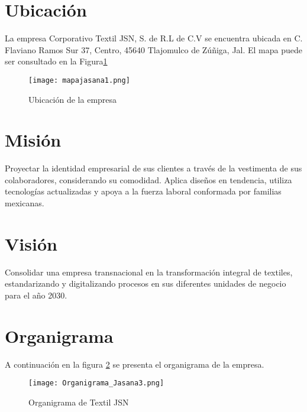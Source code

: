 \documentclass[12pt,letterpaper,spanish]{report}
\begin{document}

\section{Ubicación}
La empresa Corporativo Textil JSN, S. de R.L de C.V se encuentra ubicada en C. Flaviano Ramos Sur 37, Centro, 45640 Tlajomulco de Zúñiga, Jal. El mapa puede ser consultado en la Figura\ref{a1}

\begin{figure}[htp]
  \centering
  \texttt{[image: mapajasana1.png]}
  \caption{Ubicación de la empresa}\label{a1}
\end{figure}




\section{Misión}
Proyectar la identidad empresarial de sus clientes a través de la vestimenta de sus colaboradores, considerando su comodidad. Aplica diseños en tendencia, utiliza tecnologías actualizadas y apoya a la fuerza laboral conformada por familias mexicanas.

\section{Visión}
Consolidar una empresa transnacional en la transformación integral de textiles, estandarizando y digitalizando procesos en sus diferentes unidades de negocio para el año 2030.

\section{Organigrama}
A continuación en la figura \ref{a2} se presenta el organigrama de la empresa.

\begin{figure}[htp]
  \centering
  \texttt{[image: Organigrama\_Jasana3.png]}
  \caption{Organigrama de Textil JSN}\label{a2}
\end{figure}
\end{document}
